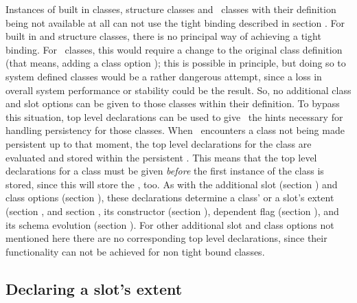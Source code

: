 Instances of built in classes, structure classes and \clos\ classes
with their definition being not available at all
can not use the tight binding described in
section .  For built in and structure
classes, there is no principal way of achieving a tight binding.  For
\clos\ classes, this would require a change to the original class
definition (that means, adding a class option ); this is possible in principle, but doing so
to system defined classes would be a rather dangerous attempt, since a
loss in overall system performance or stability could be the result.
So, no additional class and slot options can be given to those classes
within their definition. To bypass this situation, top level
declarations can be used to give \plob\ the hints necessary for
handling persistency for those classes. When \plob\ encounters a class
not being made persistent up to that moment, the top level
declarations for the class are evaluated and stored within the
persistent \clsdo. This means that the top level declarations for a
class must be given \emph{before} the first instance of the class is
stored, since this will store the \clsdo, too. As with the additional
slot (section ) and class options
(section ), these declarations
determine a class' or a slot's extent
(section , and
section , its constructor
(section ), dependent flag
(section ), and its schema evolution
(section ). For other additional
slot and class options not mentioned here there are no corresponding
top level declarations, since their functionality can not be achieved
for non tight bound classes.

\subsection{Declaring a slot's extent}

